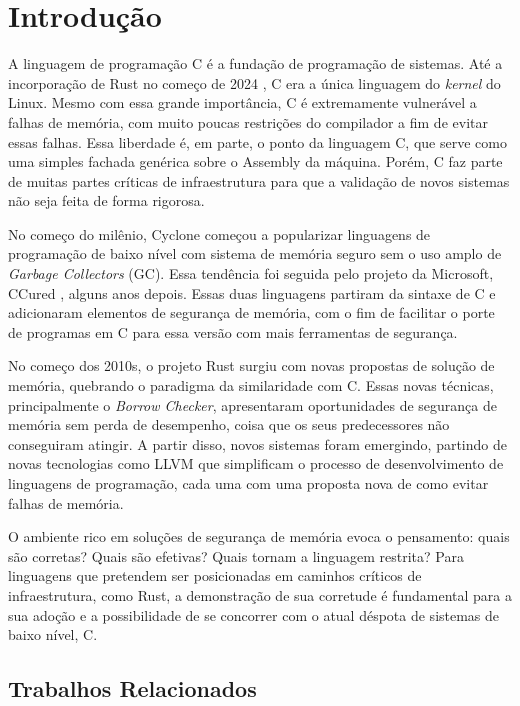\chapter{Introdução}

A linguagem de programação C \cite{CLANG} é a fundação de programação de sistemas. Até a incorporação de Rust no começo de 2024 \cite{RUSTFORLINUX}, C era a única linguagem do \emph{kernel} do Linux. Mesmo com essa grande importância, C é extremamente vulnerável a falhas de memória, com muito poucas restrições do compilador a fim de evitar essas falhas. Essa liberdade é, em parte, o ponto da linguagem C, que serve como uma simples fachada genérica sobre o Assembly da máquina. Porém, C faz parte de muitas partes críticas de infraestrutura para que a validação de novos sistemas não seja feita de forma rigorosa. 

No começo do milênio, Cyclone \cite{CYCLONE1} começou a popularizar linguagens de programação de baixo nível com sistema de memória seguro sem o uso amplo de \emph{Garbage Collectors} (GC). Essa tendência foi seguida pelo projeto da Microsoft, CCured \cite{CCURED}, alguns anos depois. Essas duas linguagens partiram da sintaxe de C e adicionaram elementos de segurança de memória, com o fim de facilitar o porte de programas em C para essa versão com mais ferramentas de segurança.

No começo dos 2010s, o projeto Rust \cite{RUSTBOOK} surgiu com novas propostas de solução de memória, quebrando o paradigma da similaridade com C. Essas novas técnicas, principalmente o \emph{Borrow Checker}, apresentaram oportunidades de segurança de memória sem perda de desempenho, coisa que os seus predecessores não conseguiram atingir. A partir disso, novos sistemas foram emergindo, partindo de novas tecnologias como LLVM \cite{LLVM} que simplificam o processo de desenvolvimento de linguagens de programação, cada uma com uma proposta nova de como evitar falhas de memória.

O ambiente rico em soluções de segurança de memória evoca o pensamento: quais são corretas? Quais são efetivas? Quais tornam a linguagem restrita? Para linguagens que pretendem ser posicionadas em caminhos críticos de infraestrutura, como Rust, a demonstração de sua corretude é fundamental para a sua adoção e a possibilidade de se concorrer com o atual déspota de sistemas de baixo nível, C.

\section{Trabalhos Relacionados}


